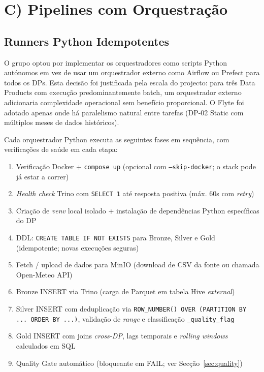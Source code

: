 \documentclass[11pt,a4paper]{article}
\begin{document}
\section{C) Pipelines com Orquestração}

\subsection{Runners Python Idempotentes}

O grupo optou por implementar os orquestradores como scripts Python autónomos em vez de usar um orquestrador externo como Airflow ou Prefect para todos os DPs. Esta decisão foi justificada pela escala do projecto: para três Data Products com execução predominantemente batch, um orquestrador externo adicionaria complexidade operacional sem benefício proporcional. O Flyte foi adotado apenas onde há paralelismo natural entre tarefas (DP-02 Static com múltiplos meses de dados históricos).

Cada orquestrador Python executa as seguintes fases em sequência, com verificações de saúde em cada etapa:

\begin{enumerate}[leftmargin=*,noitemsep]
  \item Verificação Docker + \texttt{compose up} (opcional com \texttt{--skip-docker}; o stack pode já estar a correr)
  \item \textit{Health check} Trino com \texttt{SELECT 1} até resposta positiva (máx. 60s com \textit{retry})
  \item Criação de \textit{venv} local isolado + instalação de dependências Python específicas do DP
  \item DDL: \texttt{CREATE TABLE IF NOT EXISTS} para Bronze, Silver e Gold (idempotente; novas execuções seguras)
  \item Fetch / upload de dados para MinIO (download de CSV da fonte ou chamada Open-Meteo API)
  \item Bronze INSERT via Trino (carga de Parquet em tabela Hive \textit{external})
  \item Silver INSERT com deduplicação via \texttt{ROW\_NUMBER() OVER (PARTITION BY ... ORDER BY ...)}, validação de \textit{range} e classificação \texttt{\_quality\_flag}
  \item Gold INSERT com joins \textit{cross-DP}, lags temporais e \textit{rolling windows} calculados em SQL
  \item Quality Gate automático (bloqueante em FAIL; ver Secção~\ref{sec:quality})
\end{enumerate}
\end{document}

